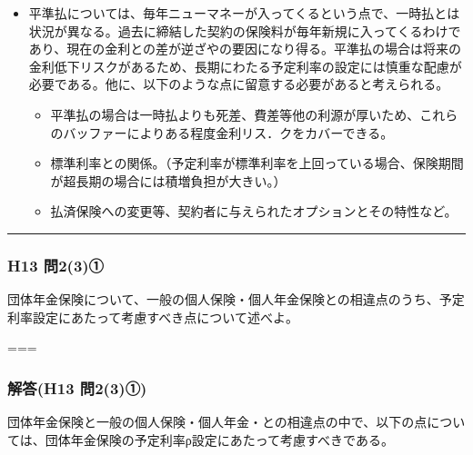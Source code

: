 \documentclass[]{article}
\begin{document}
\begin{itemize}
  \begin{itemize}
  \tightlist
  \item
    平準払については、毎年ニューマネーが入ってくるという点で、一時払とは状況が異なる。過去に締結した契約の保険料が毎年新規に入ってくるわけであり、現在の金利との差が逆ざやの要因になり得る。平準払の場合は将来の金利低下リスクがあるため、長期にわたる予定利率の設定には慎重な配慮が必要である。他に、以下のような点に留意する必要があると考えられる。

    \begin{itemize}
    \tightlist
    \item
      平準払の場合は一時払よりも死差、費差等他の利源が厚いため、これらのバッファーによりある程度金利リス．クをカバーできる。
    \item
      標準利率との関係。（予定利率が標準利率を上回っている場合、保険期間が超長期の場合には積増負担が大きい。）
    \item
      払済保険への変更等、契約者に与えられたオプションとその特性など。
    \end{itemize}
  \end{itemize}
\end{itemize}

\begin{center}\rule{0.5\linewidth}{0.5pt}\end{center}

\hypertarget{h13-ux554f23ux2460}{%
\subsubsection{H13 問2(3)①}\label{h13-ux554f23ux2460}}

団体年金保険について、一般の個人保険・個人年金保険との相違点のうち、予定利率設定にあたって考慮すべき点について述べよ。

===

\hypertarget{ux89e3ux7b54h13-ux554f23ux2460}{%
\subsubsection{解答(H13 問2(3)①)}\label{ux89e3ux7b54h13-ux554f23ux2460}}

団体年金保険と一般の個人保険・個人年金・との相違点の中で、以下の点については、団体年金保険の予定利率ρ設定にあたって考慮すべきである。
\end{document}
